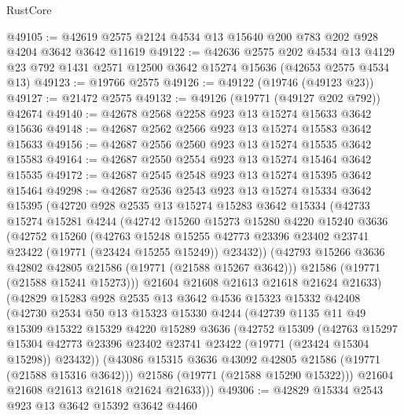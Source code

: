 \begin{lexlean}{RustCore}
\begin{coremodule}
@49105 := @42619 @2575 @2124 @4534 @13 @15640 @200 @783 @202 @928 @4204 @3642 @3642 @11619
@49122 := @42636
    @2575
    @202
    @4534
    @13
    @4129
    @23
    @792
    @1431
    @2571
    @12500
    @3642
    @15274
    @15636
    (@42653 @2575 @4534 @13)
@49123 := @19766 @2575
@49126 := @49122 (@19746 (@49123 @23))
@49127 := @21472 @2575
@49132 := @49126 (@19771 (@49127 @202 @792)) @42674
@49140 := @42678 @2568 @2258 @923 @13 @15274 @15633 @3642 @15636
@49148 := @42687 @2562 @2566 @923 @13 @15274 @15583 @3642 @15633
@49156 := @42687 @2556 @2560 @923 @13 @15274 @15535 @3642 @15583
@49164 := @42687 @2550 @2554 @923 @13 @15274 @15464 @3642 @15535
@49172 := @42687 @2545 @2548 @923 @13 @15274 @15395 @3642 @15464
@49298 := @42687
    @2536
    @2543
    @923
    @13
    @15274
    @15334
    @3642
    @15395
    (@42720
      @928
      @2535
      @13
      @15274
      @15283
      @3642
      @15334
      (@42733
        @15274
        @15281
        @4244
        (@42742
          @15260
          @15273
          @15280
          @4220
          @15240
          @3636
          (@42752
            @15260
            (@42763
              @15248
              @15255
              @42773
              @23396
              @23402
              @23741
              @23422
              (@19771 (@23424 @15255 @15249))
              @23432))
          (@42793 @15266 @3636 @42802 @42805 @21586 (@19771 (@21588 @15267 @3642)))
          @21586
          (@19771 (@21588 @15241 @15273)))
        @21604
        @21608
        @21613
        @21618
        @21624
        @21633)
      (@42829
        @15283
        @928
        @2535
        @13
        @3642
        @4536
        @15323
        @15332
        @42408
        (@42730
          @2534
          @50
          @13
          @15323
          @15330
          @4244
          (@42739
            @1135
            @11
            @49
            @15309
            @15322
            @15329
            @4220
            @15289
            @3636
            (@42752
              @15309
              (@42763
                @15297
                @15304
                @42773
                @23396
                @23402
                @23741
                @23422
                (@19771 (@23424 @15304 @15298))
                @23432))
            (@43086 @15315 @3636 @43092 @42805 @21586 (@19771 (@21588 @15316 @3642)))
            @21586
            (@19771 (@21588 @15290 @15322)))
          @21604
          @21608
          @21613
          @21618
          @21624
          @21633)))
@49306 := @42829 @15334 @2543 @923 @13 @3642 @15392 @3642 @4460

\end{coremodule}
\end{lexlean}
